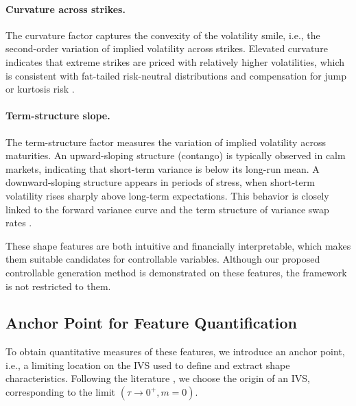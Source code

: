 \documentclass{article}
\begin{document}
\paragraph{Curvature across strikes.}  
The curvature factor captures the convexity of the volatility smile, i.e., the second-order variation of implied volatility across strikes. Elevated curvature indicates that extreme strikes are priced with relatively higher volatilities, which is consistent with fat-tailed risk-neutral distributions and compensation for jump or kurtosis risk \citep{lee2002moment}.

\paragraph{Term-structure slope.}  
The term-structure factor measures the variation of implied volatility across maturities. An upward-sloping structure (contango) is typically observed in calm markets, indicating that short-term variance is below its long-run mean. A downward-sloping structure  appears in periods of stress, when short-term volatility rises sharply above long-term expectations. This behavior is closely linked to the forward variance curve and the term structure of variance swap rates \citep{egloff2010term}.


These shape features are both intuitive and financially interpretable,  which makes them suitable candidates for controllable variables. 
Although our proposed controllable generation method is demonstrated on these features, the framework is not restricted to them.




\subsection{Anchor Point for Feature Quantification}



To obtain quantitative measures of these features, we introduce an anchor point, i.e., a limiting location on the IVS used to define and extract shape characteristics. Following the literature \citep{ait2021implied, alos2021malliavin}, we choose the origin of an IVS, corresponding to the limit $(\tau \to 0^+, m = 0)$.
\end{document}
